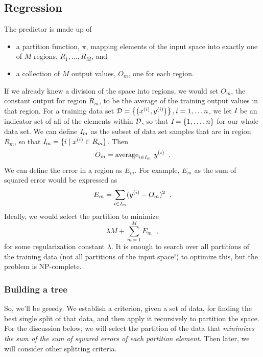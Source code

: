 \subsection{Regression}

\def\Rfeat{R}
\def\Rdata{\hat{R}}

The predictor is made up of
\begin{itemize}
  \item a partition function, $\pi$, mapping elements of the input space into
        exactly one of $M$ regions, $\Rfeat_1, \ldots, \Rfeat_M$, and
  \item a collection of $M$ output values, $O_m$, one for each region.
\end{itemize}

If we already knew a division of the space into regions, we would set
$O_m$, the constant output for region $\Rfeat_m$, to be the average of
the training output values in that region.
For a training data set ${\cal D} = \left\{\left(x^{(i)},
  y^{(i)}\right)\right\}, i = 1, \ldots n$, we let ${\emph I}$ be an indicator
set of all of the elements within ${\cal D}$, so that ${\emph I} = \{1, \ldots, n\}$ for
our whole data set.
We can define ${\emph I}_m$ as the subset of data set samples that are
in region $R_m$, so that ${\emph I}_m = \{ i \mid x^{(i)} \in R_m\}$. Then
$$O_m = {\rm average}_{i \in {\emph I}_m}~y^{(i)}\;\;.$$
We can define the error in a region as $E_m$. For example,
$E_m$ as the sum of squared error would be expressed as
\begin{equation}
  E_m = \sum_{i \in {\emph I}_m}(y^{(i)} - O_m)^2\;\;.
\end{equation}
Ideally, we would select the partition to minimize
\begin{equation}
  \lambda M + \sum_{m=1}^M E_m\;\;,
\end{equation}
for some regularization constant $\lambda$.  It is enough to search over all
partitions of the training data (not all partitions of the input
space!) to optimize this, but the problem is NP-complete.

\subsubsection{Building a tree}
So, we'll be greedy.  We establish a criterion, given a set of data,
for finding the best single split of that data, and then apply it
recursively to partition the space.  For the discussion below, we
will select the partition of
the data that {\em minimizes the sum of the sum of squared errors of
    each partition element.} Then later, we will consider other
splitting criteria.

